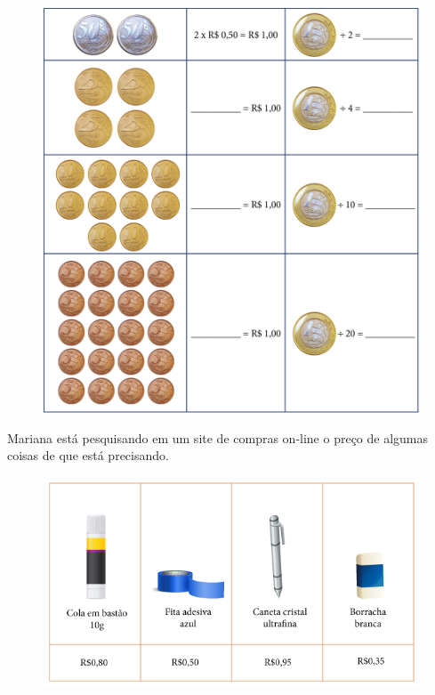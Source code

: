 \begin{figure}[htpb!]
\centering
\includegraphics[width=\textwidth]{../ilustracoes/MAT5/SAEB_5ANO_MAT_figura53.png}
\end{figure}

\pagebreak

Mariana está pesquisando em um site de compras on-line o preço de
algumas coisas de que está precisando.

\begin{figure}[htpb!]
\includegraphics[width=\textwidth]{../ilustracoes/MAT5/SAEB_5ANO_MAT_figura54.png}
\end{figure}

